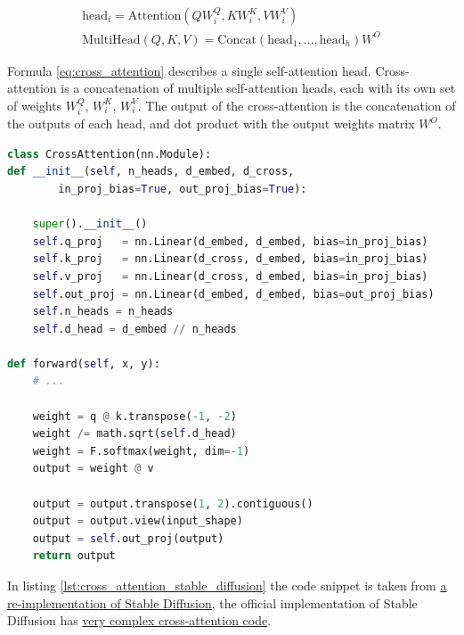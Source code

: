 \begin{equation}
    \begin{aligned}
        \text{head}_i = \text{Attention}(QW_i^Q, KW_i^K, VW_i^V)  \\
        \text{MultiHead}(Q, K, V) = \text{Concat}(\text{head}_1, ..., \text{head}_h)W^O
    \end{aligned}
    \label{eq:cross_attention}
\end{equation}

Formula \ref{eq:cross_attention} describes a single self-attention head. Cross-attention is a concatenation of multiple self-attention heads, each with its own set of weights $W_i^Q$, $W_i^K$, $W_i^V$. The output of the cross-attention is the concatenation of the outputs of each head, and dot product with the output weights matrix $W^O$.



\begin{lstlisting}[language=Python, caption={Cross-attention PyTorch code snippet. The '@' operation is a dot product.}, label={lst:cross_attention_stable_diffusion}]
class CrossAttention(nn.Module):
def __init__(self, n_heads, d_embed, d_cross, 
        in_proj_bias=True, out_proj_bias=True):

    super().__init__()
    self.q_proj   = nn.Linear(d_embed, d_embed, bias=in_proj_bias)
    self.k_proj   = nn.Linear(d_cross, d_embed, bias=in_proj_bias)
    self.v_proj   = nn.Linear(d_cross, d_embed, bias=in_proj_bias)
    self.out_proj = nn.Linear(d_embed, d_embed, bias=out_proj_bias)
    self.n_heads = n_heads
    self.d_head = d_embed // n_heads

def forward(self, x, y):
    # ...

    weight = q @ k.transpose(-1, -2)
    weight /= math.sqrt(self.d_head)
    weight = F.softmax(weight, dim=-1)
    output = weight @ v

    output = output.transpose(1, 2).contiguous()
    output = output.view(input_shape)
    output = self.out_proj(output)
    return output
\end{lstlisting}

In listing \ref{lst:cross_attention_stable_diffusion} the code snippet is taken from \href{https://github.com/hkproj/pytorch-stable-diffusion/blob/e0cb06de011787cdf13eed7b4287ad8410491149/sd/attention.py#L100C1-L110C28}{a re-implementation of Stable Diffusion}, the official implementation of Stable Diffusion has \href{https://github.com/CompVis/stable-diffusion/blob/21f890f9da3cfbeaba8e2ac3c425ee9e998d5229/ldm/modules/attention.py#L152}{very complex cross-attention code}.

















